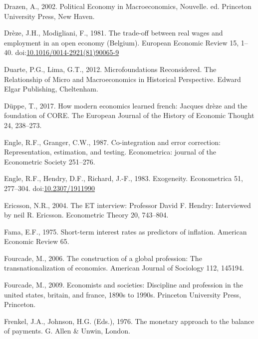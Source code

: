 \documentclass[
  12pt,
  onecolumn]{article}
\newlength{\cslhangindent}
\newlength{\cslentryspacingunit} %
\newenvironment{CSLReferences}[2] %
 {%
  \setlength{\parindent}{0pt}
  \ifodd #1
  \let\oldpar\par
  \def\par{\hangindent=\cslhangindent\oldpar}
  \fi
  \setlength{\parskip}{#2\cslentryspacingunit}
 }%
 {}
\begin{document}
\begin{CSLReferences}{1}{0}
\leavevmode{}%
Drazen, A., 2002. Political {Economy} in {Macroeconomics}, Nouvelle. ed.
{Princeton University Press}, {New Haven}.

\leavevmode{}%
Drèze, J.H., Modigliani, F., 1981. The trade-off between real wages and
employment in an open economy ({Belgium}). European Economic Review 15,
1--40.
doi:\href{https://doi.org/10.1016/0014-2921(81)90065-9}{10.1016/0014-2921(81)90065-9}

\leavevmode{}%
Duarte, P.G., Lima, G.T., 2012. Microfoundations {Reconsidered}. {The
Relationship} of {Micro} and {Macroeconomics} in {Historical
Perspective}. {Edward Elgar Publishing}, {Cheltenham}.

\leavevmode{}%
Düppe, T., 2017. How modern economics learned french: Jacques drèze and
the foundation of CORE. The European Journal of the History of Economic
Thought 24, 238--273.

\leavevmode{}%
Engle, R.F., Granger, C.W., 1987. Co-integration and error correction:
Representation, estimation, and testing. Econometrica: journal of the
Econometric Society 251--276.

\leavevmode{}%
Engle, R.F., Hendry, D.F., Richard, J.-F., 1983. Exogeneity.
Econometrica 51, 277--304.
doi:\href{https://doi.org/10.2307/1911990}{10.2307/1911990}

\leavevmode{}%
Ericsson, N.R., 2004. The {ET} interview: {Professor David F}. {Hendry}:
{Interviewed} by neil {R}. {Ericsson}. Econometric Theory 20, 743--804.

\leavevmode{}%
Fama, E.F., 1975. Short-term interest rates as predictors of inflation.
American Economic Review 65.

\leavevmode{}%
Fourcade, M., 2006. The construction of a global profession: The
transnationalization of economics. American Journal of Sociology 112,
145194.

\leavevmode{}%
Fourcade, M., 2009. Economists and societies: Discipline and profession
in the united states, britain, and france, 1890s to 1990s. Princeton
University Press, Princeton.

\leavevmode{}%
Frenkel, J.A., Johnson, H.G. (Eds.), 1976. The monetary approach to the
balance of payments. {G. Allen \& Unwin}, {London}.


\end{CSLReferences}
\end{document}
